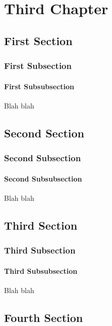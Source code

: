 \documentclass[11pt]{book}
\begin{document}
\chapter{Third Chapter}

\section{First Section}

\subsection{First Subsection}

\subsubsection{First Subsubsection}

Blah blah

\section{Second Section}

\subsection{Second Subsection}

\subsubsection{Second Subsubsection}

Blah blah

\section{Third Section}

\subsection{Third Subsection}

\subsubsection{Third Subsubsection}

Blah blah

\section{Fourth Section}
\end{document}
